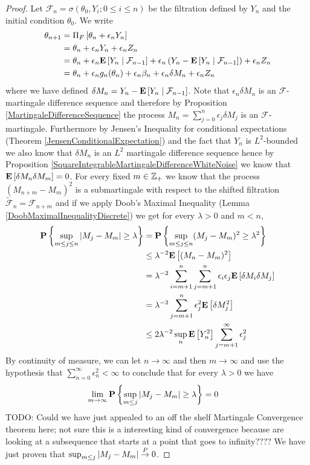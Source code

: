 \begin{proof}
Let $\mathcal{F}_n = \sigma(\theta_0, Y_i; 0 \leq i \leq n)$ be the filtration defined by $Y_n$ and the initial condition $\theta_0$.
We write
\begin{align*}
\theta_{n+1} &= \Pi_F \left [ \theta_n + \epsilon_n Y_n \right ] \\
&=\theta_n + \epsilon_n Y_n + \epsilon_n Z_n \\
&=\theta_n + \epsilon_n \cexpectationlong{\mathcal{F}_{n-1}}{Y_n} + \epsilon_n \left( Y_n -  \cexpectationlong{\mathcal{F}_{n-1}}{Y_n} \right) + \epsilon_n Z_n \\
&=\theta_n + \epsilon_n g_n(\theta_n) + \epsilon_n \beta_n + \epsilon_n \delta M_n + \epsilon_n Z_n \\
\end{align*}
where we have defined $\delta M_n = Y_n -  \cexpectationlong{\mathcal{F}_{n-1}}{Y_n}$.  Note that $\epsilon_n \delta M_n$ is an
$\mathcal{F}$-martingale difference sequence and therefore by Proposition \ref{MartingaleDifferenceSequence} the process $M_n = \sum_{j=0}^n \epsilon_j \delta M_j$ is an 
$\mathcal{F}$-martingale.  Furthermore by Jensen's Inequality for conditional expectations (Theorem \ref{JensenConditionalExpectation}) and the fact that $Y_n$ is $L^2$-bounded
we also know that $\delta M_n$ is an $L^2$ martingale difference sequence hence by Proposition \ref{SquareIntegrableMartingaleDifferenceWhiteNoise} we know that $\expectation{\delta M_n  \delta M_m} = 0$.  For every fixed $m \in \integers_+$ we know that the process $(M_{n+m} - M_m)^2$ is a submartingale with respect to the shifted
filtration $\tilde{\mathcal{F}}_n = \mathcal{F}_{n+m}$ and if we apply Doob's Maximal Inequality (Lemma \ref{DoobMaximalInequalityDiscrete}) we get for every $\lambda > 0$ and $m < n$,
\begin{align*}
\probability{\sup_{m \leq j \leq n} \abs{M_j - M_m} \geq \lambda} &= \probability{\sup_{m \leq j \leq n} (M_j - M_m)^2 \geq \lambda^2} \\
&\leq \lambda^{-2} \expectation{(M_n - M_m)^2} \\
&=\lambda^{-2}\sum_{i=m+1}^n \sum_{j=m+1}^n  \epsilon_i \epsilon_j \expectation{\delta M_i \delta M_j} \\
&=\lambda^{-2}\sum_{j=m+1}^n \epsilon_j^2  \expectation{\delta M_j^2} \\
&\leq 2 \lambda^{-2} \sup_{n} \expectation{Y_n^2} \sum_{j=m+1}^\infty \epsilon_j^2  \\
\end{align*}
By continuity of measure, we can let $n \to \infty$ and then $m \to \infty$ and use the hypothesis that $\sum_{n=0}^\infty \epsilon^2_n < \infty$ to conclude that for every $\lambda >0$ we have 
\begin{align}\label{SASimpleMartingaleNoiseConvergence}
\lim_{m \to \infty} \probability{\sup_{m \leq j} \abs{M_j - M_m} \geq \lambda} &= 0
\end{align}
TODO: Could we have just appealed to an off the shelf Martingale Convergence theorem here; not sure this is a interesting kind of convergence because are looking at a subsequence that starts at a point that goes to infinity????  We have just proven that $\sup_{m \leq j} \abs{M_j - M_m} \toprob 0$.


\end{proof}
